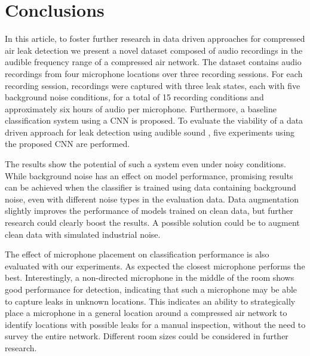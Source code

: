 \section{Conclusions}\label{sec:conc}

In this article, to foster further research in data driven approaches for compressed air leak detection we present a novel dataset composed of audio recordings in the audible frequency range of a compressed air network. The dataset contains audio recordings from four microphone locations over three recording sessions. For each recording session, recordings were captured with three leak states, each with five background noise conditions, for a total of 15 recording conditions and approximately six hours of audio per microphone. Furthermore, a baseline classification system using a CNN is proposed. To evaluate the viability of a data driven approach for leak detection using audible sound , five experiments using the proposed CNN are performed. 

The results show the potential of such a system even under noisy conditions. While background noise has an effect on model performance, promising results can be achieved when the classifier is trained using data containing background noise, even with different noise types in the evaluation data. Data augmentation slightly improves the performance of models trained on clean data, but further research could clearly boost the results. A possible solution could be to augment clean data with simulated industrial noise.

The effect of microphone placement on classification performance is also evaluated with our experiments. As expected the closest microphone performs the best. Interestingly, a non-directed microphone in the middle of the room shows good performance for detection, indicating that such a microphone may be able to capture leaks in unknown locations. This indicates an ability to strategically place a microphone in a general location around a compressed air network to identify locations with possible leaks for a manual inspection, without the need to survey the entire network. Different room sizes could be considered in further research. 


